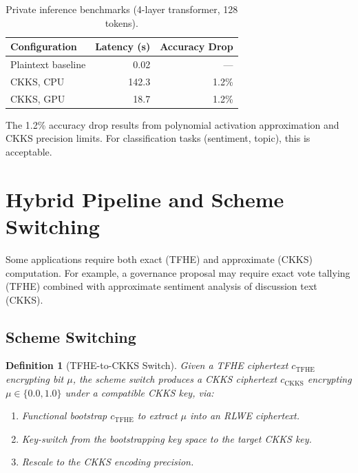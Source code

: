 \documentclass[11pt,a4paper]{article}
\newtheorem{definition}{Definition}[section]
\begin{document}
\begin{table}[h]
\centering
\caption{Private inference benchmarks (4-layer transformer, 128 tokens).}
\label{tab:nlp_bench}
\begin{tabular}{@{}lrr@{}}
\toprule
\textbf{Configuration} & \textbf{Latency (s)} & \textbf{Accuracy Drop} \\
\midrule
Plaintext baseline & 0.02 & --- \\
CKKS, CPU          & 142.3 & 1.2\% \\
CKKS, GPU          & 18.7  & 1.2\% \\
\bottomrule
\end{tabular}
\end{table}

The 1.2\% accuracy drop results from polynomial activation approximation
and CKKS precision limits.  For classification tasks (sentiment, topic),
this is acceptable.

\section{Hybrid Pipeline and Scheme Switching}
\label{sec:hybrid}

Some applications require both exact (TFHE) and approximate (CKKS)
computation.  For example, a governance proposal may require exact
vote tallying (TFHE) combined with approximate sentiment analysis of
discussion text (CKKS).

\subsection{Scheme Switching}

\begin{definition}[TFHE-to-CKKS Switch]
    Given a TFHE ciphertext $c_{\mathrm{TFHE}}$ encrypting bit $\mu$,
    the scheme switch produces a CKKS ciphertext
    $c_{\mathrm{CKKS}}$ encrypting $\mu \in \{0.0, 1.0\}$ under
    a compatible CKKS key, via:
    \begin{enumerate}
        \item Functional bootstrap $c_{\mathrm{TFHE}}$ to extract
        $\mu$ into an RLWE ciphertext.
        \item Key-switch from the bootstrapping key space to the target
        CKKS key.
        \item Rescale to the CKKS encoding precision.
    \end{enumerate}
\end{definition}
\end{document}
